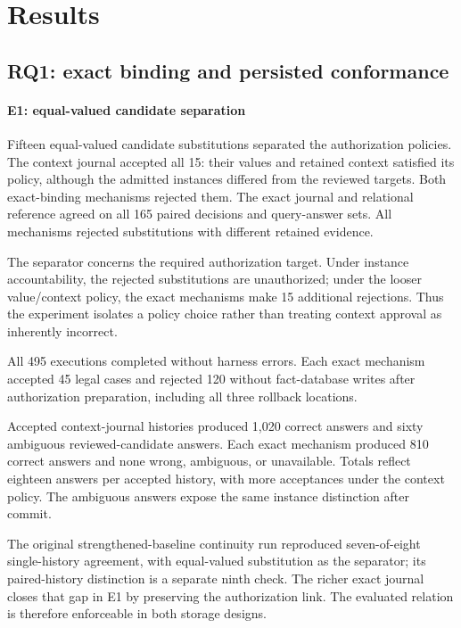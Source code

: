 \section{Results}
\label{sec:results}

\subsection{RQ1: exact binding and persisted conformance}

\paragraph{E1: equal-valued candidate separation}
\label{sec:executable-relation-result}
Fifteen equal-valued candidate substitutions separated the authorization policies. The context journal accepted all 15: their values and retained context satisfied its policy, although the admitted instances differed from the reviewed targets. Both exact-binding mechanisms rejected them. The exact journal and relational reference agreed on all 165 paired decisions and query-answer sets. All mechanisms rejected substitutions with different retained evidence.



The separator concerns the required authorization target. Under instance accountability, the rejected substitutions are unauthorized; under the looser value/context policy, the exact mechanisms make 15 additional rejections. Thus the experiment isolates a policy choice rather than treating context approval as inherently incorrect.

All 495 executions completed without harness errors. Each exact mechanism accepted 45 legal cases and rejected 120 without fact-database writes after authorization preparation, including all three rollback locations.

Accepted context-journal histories produced 1,020 correct answers and sixty ambiguous reviewed-candidate answers. Each exact mechanism produced 810 correct answers and none wrong, ambiguous, or unavailable. Totals reflect eighteen answers per accepted history, with more acceptances under the context policy. The ambiguous answers expose the same instance distinction after commit.

The original strengthened-baseline continuity run reproduced seven-of-eight single-history agreement, with equal-valued substitution as the separator; its paired-history distinction is a separate ninth check. The richer exact journal closes that gap in E1 by preserving the authorization link. The evaluated relation is therefore enforceable in both storage designs.

